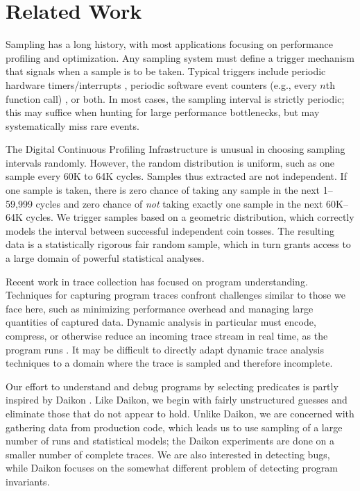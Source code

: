 \section{Related Work}
\label{sec:related-work}

Sampling has a long history, with most applications focusing on
performance profiling and optimization.  Any sampling system must
define a trigger mechanism that signals when a sample is to be taken.
Typical triggers include periodic hardware timers/interrupts
\cite{Burrows:2000:EFV,Traub:200:EILPP,Whaley:337483}, periodic
software event counters (e.g., every $n$th function call)
\cite{Arnold:2000:ACCTS}, or both.  In most cases, the sampling
interval is strictly periodic; this may suffice when hunting for large
performance bottlenecks, but may systematically miss rare events.

The Digital Continuous Profiling Infrastructure
\cite{Anderson:1997:CPW} is unusual in choosing sampling intervals
randomly.  However, the random distribution is uniform, such as one
sample every 60K to 64K cycles.  Samples thus extracted are not
independent.  If one sample is taken, there is zero chance of taking
any sample in the next 1--59,999 cycles and zero chance of \emph{not}
taking exactly one sample in the next 60K--64K cycles.  We trigger
samples based on a geometric distribution, which correctly models the
interval between successful independent coin tosses.  The resulting data is a
statistically rigorous fair random sample, which in turn grants access
to a large domain of powerful statistical analyses.

Recent work in trace collection has focused on program understanding.
Techniques for capturing program traces confront challenges similar to
those we face here, such as minimizing performance overhead and
managing large quantities of captured data.  Dynamic analysis in
particular must encode, compress, or otherwise reduce an incoming
trace stream in real time, as the program runs
\cite{Demsky:RBEOOP:2002,ICSE01*221}.  It may be difficult to directly
adapt dynamic trace analysis techniques to a domain where the trace is
sampled and therefore incomplete.  

Our effort to understand and debug programs by selecting predicates is
partly inspired by Daikon \cite{ernst2001}.  Like Daikon, we begin
with fairly unstructured guesses and eliminate those that do not
appear to hold.  Unlike Daikon, we are concerned with gathering
data from production code, which leads us to use sampling of a large
number of runs and statistical models; the Daikon experiments are
done on a smaller number of complete traces.  We are also interested
in detecting bugs, while Daikon focuses on the somewhat different problem of
detecting program invariants.

